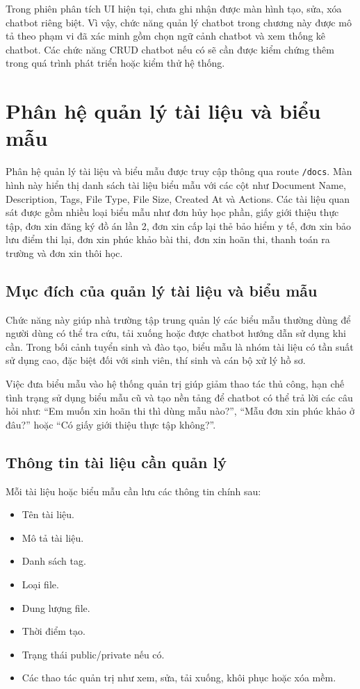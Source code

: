 \documentclass[12pt,a4paper]{report}
\begin{document}
Trong phiên phân tích UI hiện tại, chưa ghi nhận được màn hình tạo, sửa, xóa chatbot riêng biệt. Vì vậy, chức năng quản lý chatbot trong chương này được mô tả theo phạm vi đã xác minh gồm chọn ngữ cảnh chatbot và xem thống kê chatbot. Các chức năng CRUD chatbot nếu có sẽ cần được kiểm chứng thêm trong quá trình phát triển hoặc kiểm thử hệ thống.

\section{Phân hệ quản lý tài liệu và biểu mẫu}

Phân hệ quản lý tài liệu và biểu mẫu được truy cập thông qua route \texttt{/docs}. Màn hình này hiển thị danh sách tài liệu biểu mẫu với các cột như Document Name, Description, Tags, File Type, File Size, Created At và Actions. Các tài liệu quan sát được gồm nhiều loại biểu mẫu như đơn hủy học phần, giấy giới thiệu thực tập, đơn xin đăng ký đồ án lần 2, đơn xin cấp lại thẻ bảo hiểm y tế, đơn xin bảo lưu điểm thi lại, đơn xin phúc khảo bài thi, đơn xin hoãn thi, thanh toán ra trường và đơn xin thôi học.

\subsection{Mục đích của quản lý tài liệu và biểu mẫu}

Chức năng này giúp nhà trường tập trung quản lý các biểu mẫu thường dùng để người dùng có thể tra cứu, tải xuống hoặc được chatbot hướng dẫn sử dụng khi cần. Trong bối cảnh tuyển sinh và đào tạo, biểu mẫu là nhóm tài liệu có tần suất sử dụng cao, đặc biệt đối với sinh viên, thí sinh và cán bộ xử lý hồ sơ.

Việc đưa biểu mẫu vào hệ thống quản trị giúp giảm thao tác thủ công, hạn chế tình trạng sử dụng biểu mẫu cũ và tạo nền tảng để chatbot có thể trả lời các câu hỏi như: ``Em muốn xin hoãn thi thì dùng mẫu nào?'', ``Mẫu đơn xin phúc khảo ở đâu?'' hoặc ``Có giấy giới thiệu thực tập không?''.

\subsection{Thông tin tài liệu cần quản lý}

Mỗi tài liệu hoặc biểu mẫu cần lưu các thông tin chính sau:

\begin{itemize}
    \item Tên tài liệu.
    \item Mô tả tài liệu.
    \item Danh sách tag.
    \item Loại file.
    \item Dung lượng file.
    \item Thời điểm tạo.
    \item Trạng thái public/private nếu có.
    \item Các thao tác quản trị như xem, sửa, tải xuống, khôi phục hoặc xóa mềm.
\end{itemize}
\end{document}
